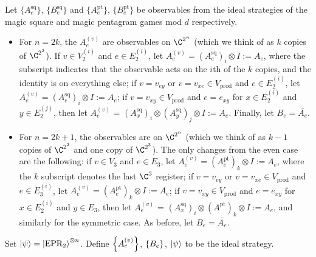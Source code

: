 \begin{definition}
Let $\{A^{\text{sq}}_e\}$, $\{B^{\text{sq}}_e\}$ and $\{A^{\text{pt}}_e\}$, $\{B^{\text{pt}}_e\}$  be observables from the ideal strategies of the magic square and magic pentagram games mod $d$ respectively.
\begin{itemize}
\item For $n = 2k$, the $A_e^{(v)}$ are observables on $\C^{2^n}$ (which we think of as $k$ copies of $\C^{2^2}$). If $v \in V_2^{(i)}$ and $e \in E_2^{(i)}$, let $A_e^{(v)} = (A^{\text{sq}}_e)_i \otimes I := A_e$, where the subscript indicates that the observable acts on the $i$th of the $k$ copies, and the identity is on everything else; if $v = v_{ey}$ or $v = v_{xe} \in V_\text{prod}$ and $e \in E_2^{(i)}$, let $A_e^{(v)} =  (A^{\text{sq}}_e)_i \otimes I := A_e$; if $v = v_{xy} \in V_\text{prod}$ and $e = e_{xy}$ for $x \in E_2^{(i)}$ and $y \in E_2^{(j)}$, then let $A_e^{(v)}$ = $(A^{\text{sq}}_x)_i \otimes (A^{\text{sq}}_y)_j \otimes I := A_e$. Finally, let $B_e = \bar{A_e}$.
\item For $n = 2k+1$, the observables are on $\C^{2^n}$ (which we think of as $k-1$ copies of $\C^{2^2}$ and one copy of $\C^{2^3}$). The only changes from the even case are the following: if $v \in V_3$ and $e \in E_3$, let $A_e^{(v)} = (A^{\text{pt}}_e)_k \otimes I := A_e$, where the $k$ subscript denotes the last $\C^3$ register; if $v = v_{ey}$ or $v = v_{xe} \in V_\text{prod}$ and $e \in E_3^{(i)}$, let $A_e^{(v)} =  (A^{\text{pt}}_e)_k \otimes I := A_e$; if $v = v_{xy} \in V_\text{prod}$ and $e = e_{xy}$ for $x \in E_2^{(i)}$ and $y \in E_3$, then let $A_e^{(v)}$ = $(A^{\text{sq}}_x)_i \otimes (A^{\text{pt}})_k \otimes I := A_e$, and similarly for the symmetric case. As before, let $B_e = \bar{A_e}$.
\end{itemize}
Set $\ket\psi = \ket{\text{EPR}_2}^{\otimes n}$. Define $\left\{A_e^{(v)}\right\}$, $\left\{B_e\right\}$, $\ket\psi$ to be the ideal strategy.
\end{definition}


